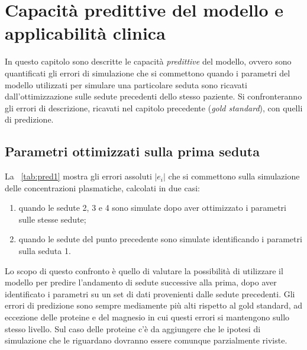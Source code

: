 \chapter{Capacità predittive del modello e applicabilità clinica}\label{ch:predizione}
In questo capitolo sono descritte le capacità \textit{predittive} del modello, ovvero sono quantificati gli errori di simulazione che si commettono quando i parametri del modello utilizzati per simulare una particolare seduta sono ricavati dall'ottimizzazione sulle sedute precedenti dello stesso paziente. Si confronteranno gli errori di descrizione, ricavati nel capitolo precedente (\textit{gold standard}), con quelli di predizione.

\section{Parametri ottimizzati sulla prima seduta}\label{sec:ott1sed}
La \tablename~\ref{tab:pred1} mostra gli errori assoluti $|e_i|$ che si commettono sulla simulazione delle concentrazioni plasmatiche, calcolati in due casi:
\begin{enumerate}
	\item quando le sedute 2, 3 e 4 sono simulate dopo aver ottimizzato i parametri sulle stesse sedute;
	\item quando le sedute del punto precedente sono simulate identificando i parametri sulla seduta 1.
\end{enumerate}
Lo scopo di questo confronto è quello di valutare la possibilità di utilizzare il modello per predire l'andamento di sedute successive alla prima, dopo aver identificato i parametri su un set di dati provenienti dalle sedute precedenti.
Gli errori di predizione sono sempre mediamente più alti rispetto al gold standard, ad eccezione delle proteine e del magnesio in cui questi errori si mantengono sullo stesso livello. Sul caso delle proteine c'è da aggiungere che le ipotesi di simulazione che le riguardano dovranno essere comunque parzialmente riviste.

